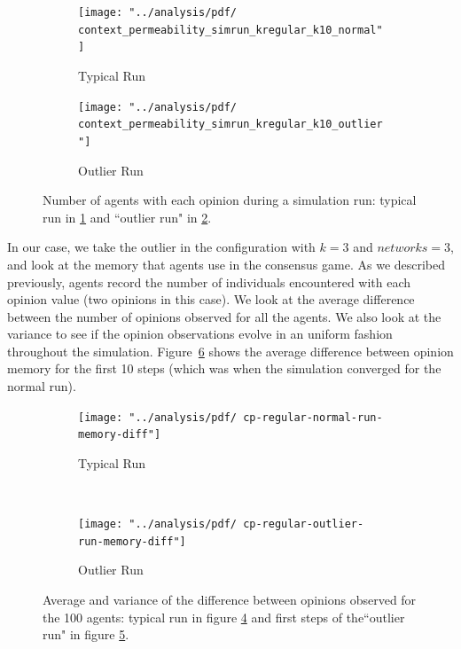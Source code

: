 \documentclass[preprint,number]{elsarticle}
\begin{document}
\begin{figure}[H]
	\centering
	\begin{subfigure}{.49\linewidth}
		\centering
		\texttt{[image: "../analysis/pdf/ context\_permeability\_simrun\_kregular\_k10\_normal"]}
		\caption{Typical Run}
		\label{fig:ctx_perm_kreg_run_normal}
	\end{subfigure}%
	\begin{subfigure}{.49\linewidth}
		\centering
		\texttt{[image: "../analysis/pdf/ context\_permeability\_simrun\_kregular\_k10\_outlier"]}
		\caption{Outlier Run}
		\label{fig:ctx_perm_kreg_run_outlier}
	\end{subfigure}
	
	\begin{minipage}{0.9\linewidth}
		\vspace{0.2cm}
		\caption{Number of agents with each opinion during a simulation run: typical run in \ref{fig:ctx_perm_kreg_run_normal} and ``outlier run" in \ref{fig:ctx_perm_kreg_run_outlier}.}
		\label{fig:ctx_perm_kreg_runs}
	\end{minipage}
\end{figure}


\noindent In our case, we take the outlier in the configuration with $k=3$ and $networks=3$, and look at the memory that agents use in the consensus game. As we described previously, agents record the number of individuals encountered with each opinion value (two opinions in this case). We look at the average difference between the number of opinions observed for all the agents. We also look at the variance to see if the opinion observations evolve in an uniform fashion throughout the simulation. Figure~\ref{fig:ctx_perm_kreg_runs_diff} shows the average difference between opinion memory for the first 10 steps (which was when the simulation converged for the normal run).

\begin{figure}[H]
	\centering
	\begin{subfigure}{1\linewidth}
		\centering
		\texttt{[image: "../analysis/pdf/ cp-regular-normal-run-memory-diff"]}
		\caption{Typical Run}
		\label{fig:ctx_perm_kreg_run_normal_diff}
	\end{subfigure}%
	\\
	\begin{subfigure}{1\linewidth}
		\centering
		\texttt{[image: "../analysis/pdf/ cp-regular-outlier-run-memory-diff"]}
		\caption{Outlier Run}
		\label{fig:ctx_perm_kreg_run_outlier_diff}
	\end{subfigure}
	
	\begin{minipage}{0.9\linewidth}
		\vspace{0.2cm}
		\caption{Average and variance of the difference between opinions observed for the 100 agents: typical run in figure \ref{fig:ctx_perm_kreg_run_normal_diff} and first steps of the``outlier run" in figure \ref{fig:ctx_perm_kreg_run_outlier_diff}.}
		\label{fig:ctx_perm_kreg_runs_diff}
	\end{minipage}
\end{figure}
\end{document}
